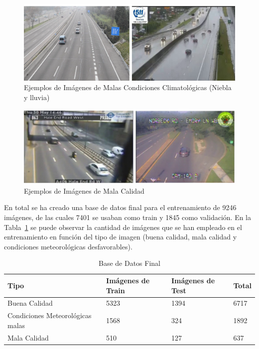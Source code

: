 \begin{figure}[H] 
\begin{center}
	\includegraphics[width=1\textwidth]{figures/Experimentos/malas_condiciones.png}
   \caption{Ejemplos de Imágenes de Malas Condiciones Climatológicas (Niebla y lluvia)}
	\label{fig.malas_condiciones}
\end{center}
\end{figure}

\begin{figure}[H] 
\begin{center}
	\includegraphics[width=1\textwidth]{figures/Experimentos/mala_calidad.png}
   \caption{Ejemplos de Imágenes de Mala Calidad}
	\label{fig.mala_calidad}
\end{center}
\end{figure}

En total se ha creado una base de datos final para el entrenamiento de 9246 imágenes, de las cuales 7401 se usaban como train y 1845 como validación. En la Tabla~\ref{base_datos_final_train} se puede observar la cantidad de imágenes que se han empleado en el entrenamiento en función del tipo de imagen (buena calidad, mala calidad y condiciones meteorológicas desfavorables).

\begin{table}[htbp][H] 
\begin{center}
\begin{tabular}{|l|l|l|l|}
\hline
Tipo  & Imágenes de Train & Imágenes de Test & Total \\
\hline \hline
Buena Calidad & 5323 &  1394 & 6717 \\ \hline
Condiciones Meteorológicas malas & 1568 & 324 & 1892 \\ \hline
Mala Calidad & 510 & 127 & 637 \\ \hline
\end{tabular}
\caption{Base de Datos Final}
\label{base_datos_final_train}
\end{center}
\end{table}

